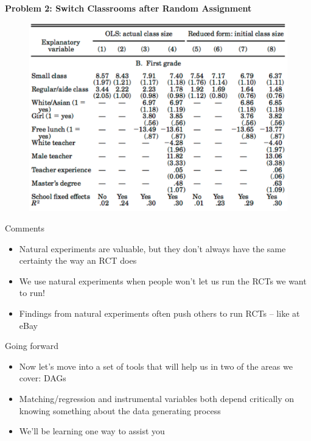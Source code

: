 \documentclass{beamer}
\begin{document}
\begin{frame}[plain]
	\begin{center}
	\textbf{Problem 2: Switch Classrooms after Random Assignment}
	\end{center}
	
	\begin{figure}
	\includegraphics[scale=0.4]{./lecture_includes/krueger1999_table5c.pdf}
	\end{figure}
\end{frame}




\begin{frame}{Comments}

\begin{itemize}
\item Natural experiments are valuable, but they don't always have the same certainty the way an RCT does
\item We use natural experiments when people won't let us run the RCTs we want to run!
\item Findings from natural experiments often push others to run RCTs -- like at eBay
\end{itemize}

\end{frame}


\begin{frame}{Going forward}

\begin{itemize}

\item Now let's move into a set of tools that will help us in two of the areas we cover:  DAGs
\item Matching/regression and instrumental variables both depend critically on knowing something about the data generating process
\item We'll be learning one way to assist you
\end{itemize}

\end{frame}
\end{document}

